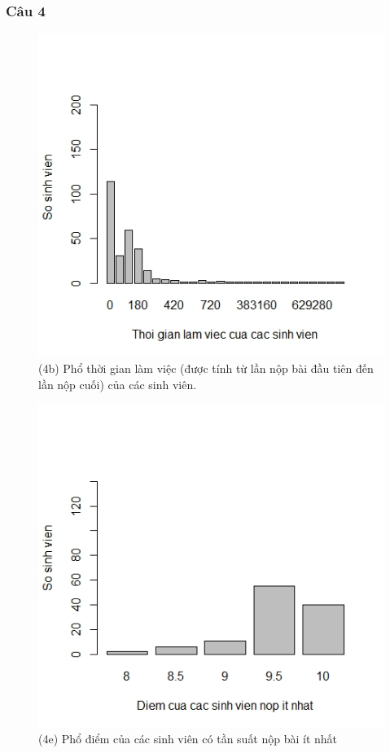 \documentclass[a4paper]{article}
\theoremstyle{definition}
\begin{document}
\subsubsection{Câu 4}
\begin{figure}[!ht]
    \centering
    \includegraphics[scale=0.4]{Pics/q4b-file3.jpeg}
    \caption{(4b) Phổ thời gian làm việc (được tính từ lần nộp bài đầu tiên đến lần nộp cuối) của các
sinh viên.}
    \label{fig:my_label}
\end{figure}
\newpage
\begin{figure}[!ht]
    \centering
    \includegraphics[scale=0.4]{Pics/q4e-file3.jpeg}
    \caption{(4e) Phổ điểm của các sinh viên có tần suất nộp bài ít nhất}
    \label{fig:my_label}
\end{figure}
\end{document}
